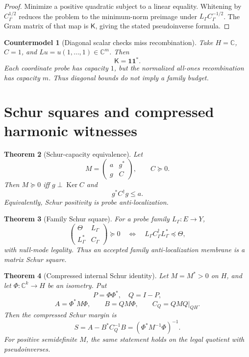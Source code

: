 \documentclass[11pt]{article}
\newtheorem{theorem}{Theorem}[section]
\newtheorem{countermodel}[theorem]{Countermodel}
\DeclareMathOperator{\kernel}{Ker}
\newcommand{\K}{\mathsf K}
\begin{document}
\begin{proof}
Minimize a positive quadratic subject to a linear equality.  Whitening by \(C_\Gamma^{1/2}\) reduces the problem to the minimum-norm preimage under \(L_\Gamma C_\Gamma^{-1/2}\).  The Gram matrix of that map is \(\K\), giving the stated pseudoinverse formula.
\end{proof}

\begin{countermodel}[Diagonal scalar checks miss recombination]
Take \(H=\mathbb C\), \(C=1\), and \(Lu=u(1,\dots,1)\in\mathbb C^m\).  Then
\[
  \K=\mathbf 1\mathbf 1^*.
\]
Each coordinate probe has capacity \(1\), but the normalized all-ones recombination has capacity \(m\).  Thus diagonal bounds do not imply a family budget.
\end{countermodel}

\section{Schur squares and compressed harmonic witnesses}

\begin{theorem}[Schur-capacity equivalence]
Let
\[
  M=\begin{pmatrix}a&g^*\\ g&C\end{pmatrix},
  \qquad C\succeq0.
\]
Then \(M\succeq0\) iff \(g\perp\kernel C\) and
\[
  g^*C^\dagger g\le a.
\]
Equivalently, Schur positivity is probe anti-localization.
\end{theorem}

\begin{theorem}[Family Schur square]
For a probe family \(L_\Gamma:E\to Y\),
\[
  \begin{pmatrix}
    \Theta & L_\Gamma\\
    L_\Gamma^* & C_\Gamma
  \end{pmatrix}\succeq0
  \quad\Longleftrightarrow\quad
  L_\Gamma C_\Gamma^\dagger L_\Gamma^*\preceq\Theta,
\]
with null-mode legality.  Thus an accepted family anti-localization membrane is a matrix Schur square.
\end{theorem}

\begin{theorem}[Compressed internal Schur identity]
Let \(M=M^*>0\) on \(H\), and let \(\Phi:\mathbb C^k\to H\) be an isometry.  Put
\[
  P=\Phi\Phi^*,\quad Q=I-P,
\]
\[
  A=\Phi^*M\Phi,
  \qquad B=QM\Phi,
  \qquad C_Q=QMQ|_{QH}.
\]
Then the compressed Schur margin is
\[
  S=A-B^*C_Q^{-1}B=(\Phi^*M^{-1}\Phi)^{-1}.
\]
For positive semidefinite \(M\), the same statement holds on the legal quotient with pseudoinverses.
\end{theorem}
\end{document}
